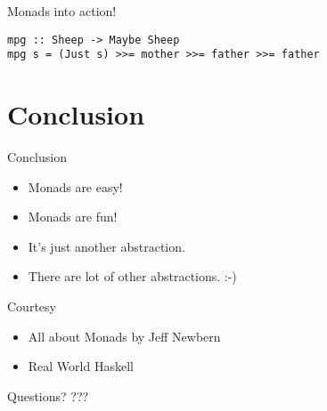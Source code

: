 \documentclass{beamer}
\begin{document}
\begin{frame}[fragile]{Monads into action!}
\begin{lstlisting}
mpg :: Sheep -> Maybe Sheep
mpg s = (Just s) >>= mother >>= father >>= father 
\end{lstlisting}
\end{frame}

\section{Conclusion}
\begin{frame}{Conclusion}
  \begin{itemize}
  \item Monads are easy!
  \item Monads are fun!
  \item It's just another abstraction.
  \item There are lot of other abstractions. :-)
  \end{itemize}
\end{frame} 

\begin{frame}{Courtesy}
  \begin{itemize}
  \item All about Monads by Jeff Newbern

  \item Real World Haskell
  \end{itemize}
\end{frame}

\begin{frame}{Questions?}
  ???
\end{frame}
\end{document}

